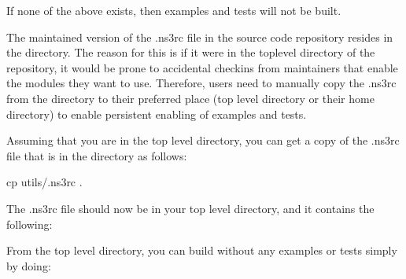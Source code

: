 \documentclass[letterpaper,10pt,english]{sphinxmanual}
\renewcommand{\sphinxcode}[1]{\texttt{\small{#1}}}
\begin{document}
If none of the above exists, then examples and tests will not be built.

The maintained version of the .ns3rc file in the  source code repository resides in the \sphinxcode{} directory.  The reason for this is if it were in the top\sphinxhyphen{}level directory of the repository, it would be prone to accidental checkins from maintainers that enable the modules they want to use.  Therefore, users need to manually copy the .ns3rc from the \sphinxcode{} directory to their preferred place (top level directory or their home directory) to enable persistent enabling of examples and tests.

Assuming that you are in the top level  directory, you can get a copy of the .ns3rc file that is in the \sphinxcode{} directory as follows:

\begin{sphinxVerbatim}[commandchars=\\\{\}]
\PYGZdl{} cp utils/.ns3rc .
\end{sphinxVerbatim}

The .ns3rc file should now be in your top level  directory, and it contains the following:

\begin{sphinxVerbatim}[commandchars=\\\{\}]

  \PYG{p}{[}\PYG{p}{]}

  

  
\end{sphinxVerbatim}

From the top level  directory, you can build  without any
examples or tests simply by doing:
\end{document}
